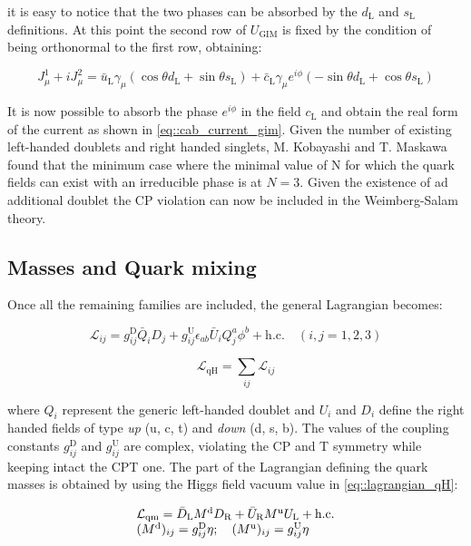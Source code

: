 it is easy to notice that the two phases can be absorbed by the $d_{\text{L}}$ and $s_{\text{L}}$ definitions. At this point the second row of $U_{\text{GIM}}$ is fixed by the condition of being orthonormal to the first row, obtaining:

\begin{equation}
J^{1}_{\mu} + i J^{2}_{\mu} =  \bar{u}_{\text{L}}\gamma_{\mu} \left(\cos\theta d_{\text{L}} +\sin\theta s_{\text{L}}\right) + \bar{c}_{\text{L}}\gamma_{\mu}e^{i\phi} (-\sin\theta d_{\text{L}} + \cos\theta s_{\text{L}})
\end{equation}

It is now possible to absorb the phase $e^{i\phi}$ in the field $c_{\text{L}}$ and obtain the real form of the current as shown in \autoref{eq::cab_current_gim}. Given the number of existing left-handed doublets and right handed singlets, M. Kobayashi and T. Maskawa found that the minimum case where the minimal value of N for which the quark fields can exist with an irreducible phase is at $N = 3$. Given the existence of ad additional doublet the CP violation can now be included in the Weimberg-Salam theory.

\subsection{Masses and Quark mixing}

Once all the remaining families are included, the general Lagrangian becomes:

\begin{equation}
\mathcal{L}_{ij} = g^{\text{D}}_{ij}\bar{Q}_{i}D_{j} + g^{\text{U}}_{ij}\epsilon_{ab}\bar{U}_{i}Q^{a}_{j}\phi^{b} + \text{h.c.} \quad (i,j = 1,2,3)
\end{equation}

\begin{equation}
\mathcal{L}_{\text{qH}} = \sum_{ij}\mathcal{L}_{ij}
\label{eq::lagrangian_qH}
\end{equation}

where $Q_{i}$ represent the generic left-handed doublet and $U_{i}$ and $D_{i}$ define the right handed fields of type \textit{up} (u, c, t) and \textit{down} (d, s, b). The values of the coupling constants $g^{\text{D}}_{ij}$ and $g^{\text{U}}_{ij}$ are complex, violating the CP and T symmetry while keeping intact the CPT one.
The part of the Lagrangian defining the quark masses is obtained by using the Higgs field vacuum value in \autoref{eq::lagrangian_qH}:

\begin{equation}
\begin{array}{l c l}
\mathcal{L}_{\text{qm}} = \bar{D}_{\text{L}}M^{\text{d}}D_{\text{R}} + \bar{U}_{\text{R}}M^{\text{u}}U_{\text{L}} + \text{h.c.} \\
(M^{\text{d}})_{ij} = g^{\text{D}}_{ij}\eta; \quad (M^{\text{u}})_{ij} = g^{\text{U}}_{ij}\eta
\end{array}
\end{equation}

